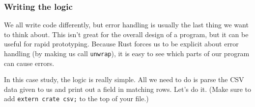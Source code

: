 \documentclass[a4paper,]{book}
\renewcommand*{\hypertarget}[3][\ar]{%
  \def\ar{#2}%
  \label{#1}%
  #3}
\begin{document}
\hypertarget{writing-the-logic}{\subsubsection{Writing the
logic}\label{writing-the-logic}}

We all write code differently, but error handling is usually the last
thing we want to think about. This isn't great for the overall design of
a program, but it can be useful for rapid prototyping. Because Rust
forces us to be explicit about error handling (by making us call
\texttt{unwrap}), it is easy to see which parts of our program can cause
errors.

In this case study, the logic is really simple. All we need to do is
parse the CSV data given to us and print out a field in matching rows.
Let's do it. (Make sure to add \texttt{extern\ crate\ csv;} to the top
of your file.)
\end{document}
